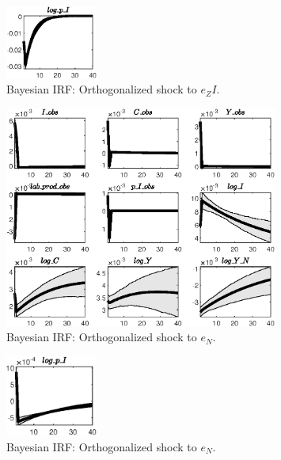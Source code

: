 \begin{figure}[H]
\centering 
\includegraphics[width=0.27\textwidth]{BRS_fd/Output/BRS_fd_Bayesian_IRF_e_ZI_2}
\caption{Bayesian IRF: Orthogonalized shock to ${e_ZI}$.}
\label{Fig:BayesianIRF:e_ZI:2}
\end{figure}
 
\begin{figure}[H]
\centering 
\includegraphics[width=0.80\textwidth]{BRS_fd/Output/BRS_fd_Bayesian_IRF_e_N_1}
\caption{Bayesian IRF: Orthogonalized shock to ${e_N}$.}
\label{Fig:BayesianIRF:e_N:1}
\end{figure}
 
\begin{figure}[H]
\centering 
\includegraphics[width=0.27\textwidth]{BRS_fd/Output/BRS_fd_Bayesian_IRF_e_N_2}
\caption{Bayesian IRF: Orthogonalized shock to ${e_N}$.}
\label{Fig:BayesianIRF:e_N:2}
\end{figure}
 
